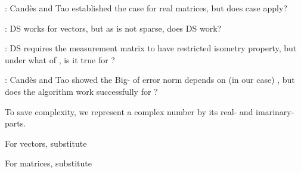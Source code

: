 {
\I {}: Candès and Tao established the case for real matrices, but does  case apply?

\I {}: DS works for  vectors, but as  is not sparse, does DS work?

\I {}: DS requires the measurement matrix to have restricted isometry property, but under what  of , is it true for ?

\I {}: Candès and Tao showed the Big- of error norm depends on (in our case) , but does the algorithm work successfully for ?
}
{
\I To save complexity, we represent a complex number by its real- and imarinary-parts.

\I For vectors, substitute

\I For matrices, substitute
}

